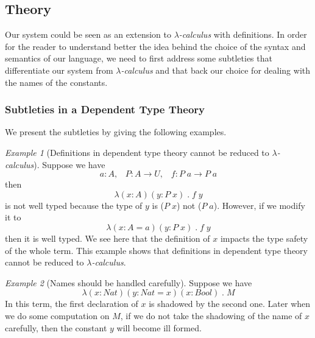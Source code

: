 \documentclass{article}
\theoremstyle{remark}
\newtheorem{example}{Example}
\begin{document}
\subsection{Theory}
Our system could be seen as an extension to \emph{$\lambda$-calculus} with definitions. In order for the reader to understand better the idea behind the choice of the syntax and semantics of our language, we need to first address some subtleties that differentiate our system from \emph{$\lambda$-calculus} and that back our choice for dealing with the names of the constants.

\subsubsection{Subtleties in a Dependent Type Theory}
We present the subtleties by giving the following examples. 

\begin{example}[Definitions in dependent type theory cannot be reduced to \emph{$\lambda$-calculus}] \label{exa1}
  Suppose we have
  \[ a : A, \;\;\; P : A \to U, \;\;\; f : P \; a \to P \; a \]
  then
  \[ \lambda (x : A) (y : P \; x) \; . \; f \; y \]
  is not well typed because the type of $y$ is ($P \; x$) not ($P \; a$). However, if we modify it to
  \[ \lambda (x : A = a) (y : P \; x) \; . \; f \; y \]
  then it is well typed. We see here that the definition of $x$ impacts the type safety of the whole term. This example shows that definitions in dependent type theory cannot be reduced to \emph{$\lambda$-calculus}.
\end{example}

\begin{example}[Names should be handled carefully] \label{exa2}
  Suppose we have
  \[ \lambda (x : Nat) (y : Nat = x) (x : Bool) \; . \; M \]
  In this term, the first declaration of $x$ is shadowed by the second one. Later when we do some computation on $M$, if we do not take the shadowing of the name of $x$ carefully, then the constant $y$ will become ill formed.
\end{example}
\end{document}
